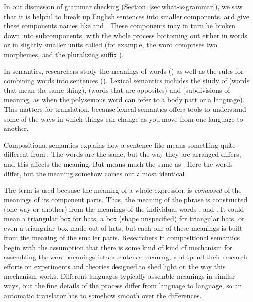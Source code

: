 In our discussion of grammar checking (Section~\ref{sec:what-is-grammar}), we saw that it is helpful to
break up English sentences into smaller components, and give these
components names like  and . These
components may in turn be broken down into subcomponents, with the
whole process bottoming out either in words or in slightly smaller units called  (for example, the word  comprises two morphemes,  and the pluralizing suffix ). 

In semantics, researchers study the meanings of words () as well as the rules for combining words into sentences (). Lexical semantics  
includes the study of  (words that mean the same thing),
 (words that are opposites) and  (subdivisions of meaning, as when the polysemous word  can refer to a body part or a language). This matters for translation, because lexical semantics offers tools to understand some of the ways in which things can 
change as you move from one language to another.


Compositional semantics explains how a sentence like  means something quite different from . The words are the same, but the way they are arranged
differs, and this affects the meaning.  But 
means much the same as .  Here the
words differ, but the meaning somehow comes out almost identical. 


The  term  is used because  the meaning of a whole expression is  \emph{composed} of the meanings of its component parts. Thus, the meaning of the phrase 
 is constructed (one way or another) 
from the
meanings of the individual words ,  and .
It could mean a triangular box for hats, a box (shape unspecified) for triangular hats, or even a triangular box made out of hats, but each one of these meanings is built from the meaning of the smaller parts.
Researchers in compositional semantics begin with the assumption that there is some kind of
kind of mechanism for assembling the word meanings into a sentence
meaning, and spend their research efforts on experiments and theories
designed to shed light on the way this mechanism works.  
Different languages typically assemble meanings in similar ways, but the fine
details of the process differ from language to language, so an
automatic translator has to somehow smooth over the differences.

